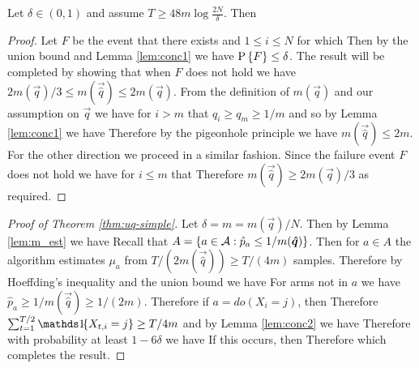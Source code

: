 \begin{lemma}\label{lem:m_est}
Let $\delta \in (0,1)$ and assume $T \geq 48m \log\frac{2N}{\delta}$. Then
\end{lemma}

\begin{proof}
Let $F$ be the event that there exists and $1 \leq i \leq N$ for which
Then by the union bound and Lemma \ref{lem:conc1} we have $\P{F} \leq \delta$. The result will be completed by showing that
when $F$ does not hold we have $2m(\vec{q})/3 \leq m(\vec{\hat q}) \leq 2m(\vec{q})$.
From the definition of $m(\vec{q})$ and our assumption on $\vec{q}$ we have for $i > m$ that $q_i \geq q_m \geq 1/m$ and so by Lemma \ref{lem:conc1} we have
Therefore by the pigeonhole principle we have $m(\vec{\hat q}) \leq 2m$.
For the other direction we proceed in a similar fashion. Since the failure event $F$ does not hold we have for $i \leq m$ that
Therefore $m(\vec{\hat q}) \geq 2m(\vec{q}) / 3$ as required. 
\end{proof}

\begin{proof}[Proof of Theorem \ref{thm:uq-simple}]
Let $\delta = m = m(\vec{q}) / N$. Then by Lemma \ref{lem:m_est} we have 
Recall that $A = \set{a \in \actions : \hat p_a \leq 1/m(\vec{\hat q})}$. Then
for $a \in A$ the algorithm estimates $\mu_a$ from $T/(2m(\vec{\hat q})) \geq T/(4m)$ samples.
Therefore by Hoeffding's inequality and the union bound we have
For arms not in $a$ we have $\hat p_a \geq 1/m(\vec{\hat q}) \geq 1/(2m)$.
Therefore if $a = do(X_i = j)$, then 
Therefore $\sum_{t=1}^{T/2} \ind{X_{t,i} = j} \geq T/4m$
and by Lemma \ref{lem:conc2} we have
Therefore with probability at least $1 - 6\delta$ we have
If this occurs, then 
Therefore
which completes the result.
\end{proof}

